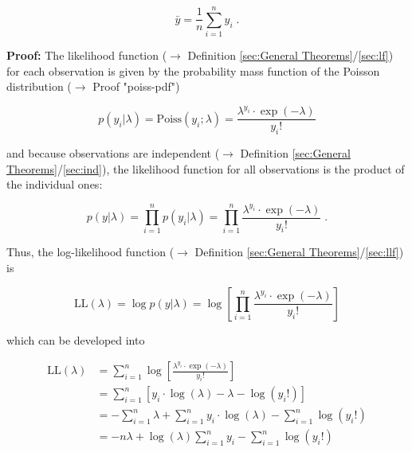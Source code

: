 \documentclass[a4paper,12pt,twoside]{book}
\begin{document}
\begin{equation} \label{eq:poiss-mle-y-mean}
\bar{y} = \frac{1}{n} \sum_{i=1}^n y_i \; .
\end{equation}


\vspace{1em}
\textbf{Proof:} The likelihood function ($\rightarrow$ Definition \ref{sec:General Theorems}/\ref{sec:lf}) for each observation is given by the probability mass function of the Poisson distribution ($\rightarrow$ Proof "poiss-pdf")

\begin{equation} \label{eq:poiss-mle-Poiss-yi}
p(y_i|\lambda) = \mathrm{Poiss}(y_i; \lambda) = \frac{\lambda^{y_i} \cdot \exp(-\lambda)}{y_i !}
\end{equation}

and because observations are independent ($\rightarrow$ Definition \ref{sec:General Theorems}/\ref{sec:ind}), the likelihood function for all observations is the product of the individual ones:

\begin{equation} \label{eq:poiss-mle-Poiss-LF}
p(y|\lambda) = \prod_{i=1}^n p(y_i|\lambda) = \prod_{i=1}^n \frac{\lambda^{y_i} \cdot \exp(-\lambda)}{y_i !} \; .
\end{equation}

Thus, the log-likelihood function ($\rightarrow$ Definition \ref{sec:General Theorems}/\ref{sec:llf}) is

\begin{equation} \label{eq:poiss-mle-Poiss-LL}
\mathrm{LL}(\lambda) = \log p(y|\lambda) = \log \left[ \prod_{i=1}^n \frac{\lambda^{y_i} \cdot \exp(-\lambda)}{y_i !} \right]
\end{equation}

which can be developed into

\begin{equation} \label{eq:poiss-mle-Poiss-LL-der}
\begin{split}
\mathrm{LL}(\lambda) &= \sum_{i=1}^n \log \left[ \frac{\lambda^{y_i} \cdot \exp(-\lambda)}{y_i !} \right] \\
&= \sum_{i=1}^n \left[ y_i \cdot \log(\lambda) - \lambda - \log(y_i !) \right] \\
&= - \sum_{i=1}^n \lambda + \sum_{i=1}^n y_i \cdot \log(\lambda) - \sum_{i=1}^n \log(y_i !) \\
&= - n \lambda + \log(\lambda) \sum_{i=1}^n y_i - \sum_{i=1}^n \log(y_i !) \\
\end{split}
\end{equation}
\end{document}
